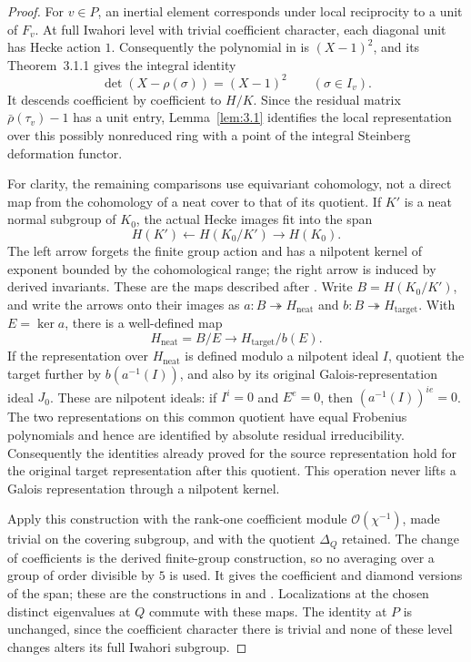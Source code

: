 \documentclass[11pt,a4paper]{article}
\numberwithin{equation}{section}
\begin{document}
\begin{proof}
For \(v\in P\), an inertial element corresponds under local reciprocity to a unit of \(F_v\). At full Iwahori level with trivial coefficient character, each diagonal unit has Hecke action \(1\). Consequently the polynomial in \cite[(2.2.7)]{ACC} is \((X-1)^2\), and its Theorem~3.1.1 gives the integral identity
\begin{equation*}
\det(X-\rho(\sigma))=(X-1)^2\qquad(\sigma\in I_v).
\end{equation*}
It descends coefficient by coefficient to \(H/K\). Since the residual matrix \(\bar\rho(\tau_v)-1\) has a unit entry, Lemma~\ref{lem:3.1} identifies the local representation over this possibly nonreduced ring with a point of the integral Steinberg deformation functor.

For clarity, the remaining comparisons use equivariant cohomology, not a direct map from the cohomology of a neat cover to that of its quotient. If \(K'\) is a neat normal subgroup of \(K_0\), the actual Hecke images fit into the span
\begin{equation*}
H(K')\longleftarrow H(K_0/K')\longrightarrow H(K_0).
\end{equation*}
The left arrow forgets the finite group action and has a nilpotent kernel of exponent bounded by the cohomological range; the right arrow is induced by derived invariants. These are the maps described after \cite[Lemma~2.2.3]{ACC}. Write \(B=H(K_0/K')\), and write the arrows onto their images as \(a:B\twoheadrightarrow H_{\mathrm{neat}}\) and \(b:B\twoheadrightarrow H_{\mathrm{target}}\). With \(E=\ker a\), there is a well-defined map
\begin{equation*}
H_{\mathrm{neat}}=B/E\longrightarrow
H_{\mathrm{target}}/b(E).
\end{equation*}
If the representation over \(H_{\mathrm{neat}}\) is defined modulo a nilpotent ideal \(I\), quotient the target further by \(b(a^{-1}(I))\), and also by its original Galois-representation ideal \(J_0\). These are nilpotent ideals: if \(I^i=0\) and \(E^e=0\), then \((a^{-1}(I))^{ie}=0\). The two representations on this common quotient have equal Frobenius polynomials and hence are identified by absolute residual irreducibility. Consequently the identities already proved for the source representation hold for the original target representation after this quotient. This operation never lifts a Galois representation through a nilpotent kernel.

Apply this construction with the rank-one coefficient module \(\mathcal O(\chi^{-1})\), made trivial on the covering subgroup, and with the quotient \(\Delta_Q\) retained. The change of coefficients is the derived finite-group construction, so no averaging over a group of order divisible by \(5\) is used. It gives the coefficient and diamond versions of the span; these are the constructions in \cite[Propositions~6.5.3 and 6.5.11]{ACC} and \cite[Lemma~5.2]{AKT}. Localizations at the chosen distinct eigenvalues at \(Q\) commute with these maps. The identity at \(P\) is unchanged, since the coefficient character there is trivial and none of these level changes alters its full Iwahori subgroup.


\end{proof}
\end{document}
